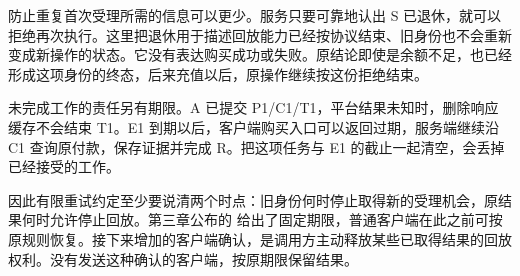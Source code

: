 防止重复首次受理所需的信息可以更少。服务只要可靠地认出 S 已退休，就可以拒绝再次执行。这里把退休用于描述回放能力已经按协议结束、旧身份也不会重新变成新操作的状态。它没有表达购买成功或失败。原结论即使是余额不足，也已经形成这项身份的终态，后来充值以后，原操作继续按这份拒绝结束。

未完成工作的责任另有期限。A 已提交 P1/C1/T1，平台结果未知时，删除响应缓存不会结束 T1。E1 到期以后，客户端购买入口可以返回过期，服务端继续沿 C1 查询原付款，保存证据并完成 R。把这项任务与 E1 的截止一起清空，会丢掉已经接受的工作。


因此有限重试约定至少要说清两个时点：旧身份何时停止取得新的受理机会，原结果何时允许停止回放。第三章公布的  给出了固定期限，普通客户端在此之前可按原规则恢复。接下来增加的客户端确认，是调用方主动释放某些已取得结果的回放权利。没有发送这种确认的客户端，按原期限保留结果。
\FloatBarrier
